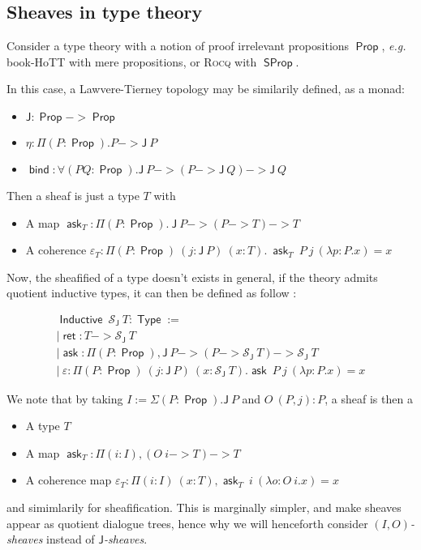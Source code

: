\documentclass{article}
\DeclareMathOperator{\Prop}{\mathsf{Prop}}
\DeclareMathOperator{\SProp}{\mathsf{SProp}}
\DeclareMathOperator{\Type}{\mathsf{Type}}
\DeclareMathOperator{\ask}{\mathsf{ask}}
\DeclareMathOperator{\bind}{\mathsf{bind}}
\DeclareMathOperator{\Inductive}{\mathsf{Inductive}}
\DeclareMathOperator{\ret}{\mathsf{ret}}
\newcommand{\0}{\mathbf{0}}
\newcommand{\1}{\mathbf{1}}
\begin{document}
\subsection{Sheaves in type theory}

Consider a type theory with a notion of proof irrelevant propositions $\Prop$, \emph{e.g.} book-HoTT with mere propositions, or \textsc{Rocq} with $\SProp$.

In this case, a Lawvere-Tierney topology may be similarily defined, as a monad:
\begin{itemize}
    \item $\mathsf{J} : \Prop -> \Prop$
    \item $\eta : \Pi (P:\Prop).P -> \mathsf{J}\ P$
    \item $\bind : \forall (P Q: \Prop). \mathsf{J}\ P -> (P -> \mathsf{J}\ Q) -> \mathsf{J}\ Q$
\end{itemize}

Then a sheaf is just a type $T$ with 
\begin{itemize}
    \item A map $\ask_T : \Pi (P:\Prop).\ \mathsf{J}\ P -> (P -> T) -> T$
    \item A coherence $\varepsilon_T : \Pi (P:\Prop)\ (j : \mathsf{J}\ P)\ (x:T).\ \ask_T\ P\ j\ (\lambda p:P.x) = x$
\end{itemize}

Now, the sheafified of a type doesn't exists in general, if the theory admits quotient inductive types, it can then be defined as follow :

$$
\begin{array}{l}
    \Inductive\ \mathcal{S}_{\mathsf{J}}\ T : \Type := \\
    | \ret : T -> \mathcal{S}_{\mathsf{J}}\ T\\
    | \ask : \Pi (P:\Prop), \mathsf{J}\ P -> (P -> \mathcal{S}_{\mathsf{J}}\ T) -> \mathcal{S}_{\mathsf{J}}\ T\\
    |\ \varepsilon : \Pi (P:\Prop)\ (j : \mathsf J\ P)\ (x : \mathcal{S}_{\mathsf{J}}\ T). \ask\ P\ j\ (\lambda p:P. x) = x
\end{array}
$$

We note that by taking $I := \Sigma (P:\Prop). \mathsf{J}\ P$ and $O\ (P,j) : P$, a sheaf is then a
\begin{itemize}
    \item A type $T$
    \item A map $\ask_T : \Pi (i:I), (O\ i -> T) -> T$
    \item A coherence map $\varepsilon_T : \Pi(i:I)\ (x:T), \ask_T\ i\ (\lambda o:O\  i.x) = x$
\end{itemize}
and simimlarily for sheafification. This is marginally simpler, and make sheaves appear as quotient dialogue trees, hence why we will henceforth consider \emph{$(I,O)$-sheaves} instead of \emph{$\mathsf{J}$-sheaves}.
\end{document}
